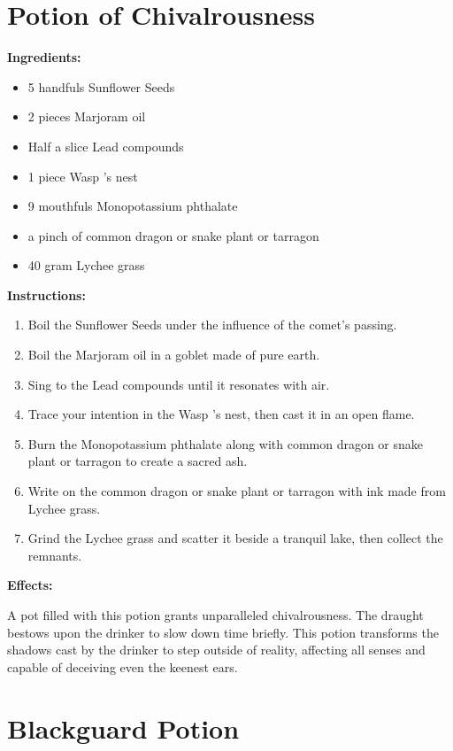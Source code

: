 \documentclass{article}
\begin{document}
\newpage
\section*{Potion of Chivalrousness}

\textbf{Ingredients:}

\begin{itemize}
  \item 5 handfuls Sunflower Seeds
  \item 2 pieces Marjoram oil
  \item Half a slice Lead compounds
  \item 1 piece Wasp 's nest
  \item 9 mouthfuls Monopotassium phthalate
  \item a pinch of common dragon or snake plant or tarragon
  \item 40 gram Lychee grass
\end{itemize}

\textbf{Instructions:}

\begin{enumerate}
  \item Boil the Sunflower Seeds under the influence of the comet’s passing.
  \item Boil the Marjoram oil in a goblet made of pure earth.
  \item Sing to the Lead compounds until it resonates with air.
  \item Trace your intention in the Wasp 's nest, then cast it in an open flame.
  \item Burn the Monopotassium phthalate along with common dragon or snake plant or tarragon to create a sacred ash.
  \item Write on the common dragon or snake plant or tarragon with ink made from Lychee grass.
  \item Grind the Lychee grass and scatter it beside a tranquil lake, then collect the remnants.
\end{enumerate}

\textbf{Effects:}

A pot filled with this potion grants unparalleled chivalrousness. The draught bestows upon the drinker to slow down time briefly. This potion transforms the shadows cast by the drinker to step outside of reality, affecting all senses and capable of deceiving even the keenest ears.

\newpage
\section*{Blackguard Potion}
\end{document}
